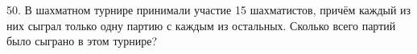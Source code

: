 50. В шахматном турнире принимали участие 15 шахматистов, причём каждый из них сыграл только одну партию с каждым из остальных. Сколько всего партий было сыграно в этом турнире?\\
